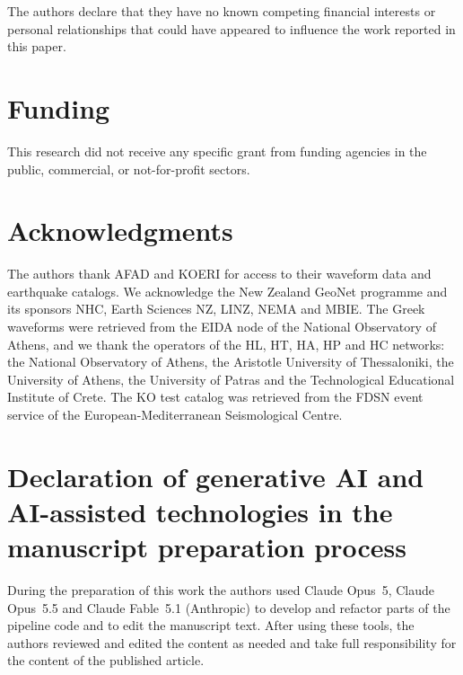 \documentclass[a4paper,fleqn]{cas-sc}
\begin{document}
The authors declare that they have no known competing financial interests or personal
relationships that could have appeared to influence the work reported in this paper.

\section*{Funding}

This research did not receive any specific grant from funding agencies in the public,
commercial, or not-for-profit sectors.

\section*{Acknowledgments}

The authors thank AFAD and KOERI for access to their waveform data and earthquake
catalogs. We acknowledge the New Zealand GeoNet programme and its sponsors NHC, Earth
Sciences NZ, LINZ, NEMA and MBIE. The Greek waveforms were retrieved from the EIDA
node of the National Observatory of Athens, and we thank the operators of the HL, HT,
HA, HP and HC networks: the National Observatory of Athens, the Aristotle University
of Thessaloniki, the University of Athens, the University of Patras and the
Technological Educational Institute of Crete. The KO test catalog was retrieved from
the FDSN event service of the European-Mediterranean Seismological Centre.

\section*{Declaration of generative AI and AI-assisted technologies in the manuscript preparation process}

During the preparation of this work the authors used Claude Opus~5, Claude
Opus~5.5 and Claude Fable~5.1 (Anthropic) to develop and refactor parts of the
pipeline code and to edit the manuscript text. After using these tools, the authors
reviewed and edited the content as needed and take full responsibility for the
content of the published article.



\end{document}
